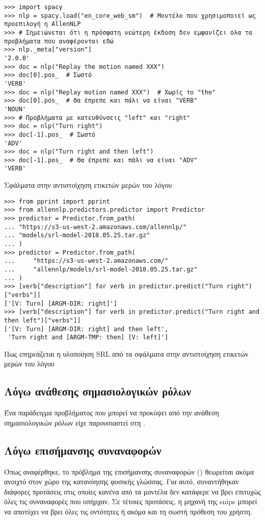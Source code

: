 \begin{listing}[p] %
    \begin{verbatim}
>>> import spacy
>>> nlp = spacy.load("en_core_web_sm")  # Μοντέλο που χρησιμοποιεί ως προεπιλογή η AllenNLP
>>> # Σημειώνεται ότι η πρόσφατη νεώτερη έκδοση δεν εμφανίζει όλα τα προβλήματα που αναφέρονται εδώ
>>> nlp._meta["version"]
'2.0.0'
>>> doc = nlp("Replay the motion named XXX")
>>> doc[0].pos_  # Σωστό
'VERB'
>>> doc = nlp("Replay motion named XXX")  # Χωρίς το "the"
>>> doc[0].pos_  # Θα έπρεπε και πάλι να είναι "VERB"
'NOUN'
>>> # Προβλήματα με κατευθύνσεις "left" και "right"
>>> doc = nlp("Turn right")
>>> doc[-1].pos_  # Σωστό
'ADV'
>>> doc = nlp("Turn right and then left")
>>> doc[-1].pos_  # Θα έπρεπε και πάλι να είναι "ADV"
'VERB'
    \end{verbatim}
    \caption{Σφάλματα στην αντιστοίχηση ετικετών μερών του λόγου}\label{lst:problem-POS}
\end{listing}
\begin{listing}[p]
    \begin{verbatim}
>>> from pprint import pprint
>>> from allennlp.predictors.predictor import Predictor
>>> predictor = Predictor.from_path(
... "https://s3-us-west-2.amazonaws.com/allennlp/"
... "models/srl-model-2018.05.25.tar.gz"
... )
>>> predictor = Predictor.from_path(
...     "https://s3-us-west-2.amazonaws.com/"
...     "allennlp/models/srl-model-2018.05.25.tar.gz"
... )
>>> [verb["description"] for verb in predictor.predict("Turn right")["verbs"]]
['[V: Turn] [ARGM-DIR: right]']
>>> [verb["description"] for verb in predictor.predict("Turn right and then left")["verbs"]]
['[V: Turn] [ARGM-DIR: right] and then left',
 'Turn right and [ARGM-TMP: then] [V: left]']
    \end{verbatim}
    \caption{Πως επηρεάζεται η υλοποίηση SRL από τα σφάλματα στην αντιστοίχηση ετικετών μερών του λόγου}\label{lst:problem-POS-SRL}
\end{listing}

\subsection{Λόγω ανάθεσης σημασιολογικών ρόλων}
Ένα παράδειγμα προβλήματος που μπορεί να προκύψει από την ανάθεση σημασιολογικών ρόλων είχε παρουσιαστεί στη .

\subsection{Λόγω επισήμανσης συναναφορών}
Όπως αναφέρθηκε, το πρόβλημα της επισήμανσης συναναφορών () θεωρείται ακόμα ανοιχτό στον χώρο της κατανόησης φυσικής γλώσσας.
Για αυτό, συναντήθηκαν διάφορες προτάσεις στις οποίες κανένα από τα μοντέλα δεν κατάφερε να βρει επιτυχώς όλες τις συναναφορές που υπήρχαν.
Σε τέτοιες προτάσεις, η μηχανή της snips μπορεί να αποτύχει να βρει όλες τις οντότητες ή ακόμα και τη σωστή πρόθεση του χρήστη.

